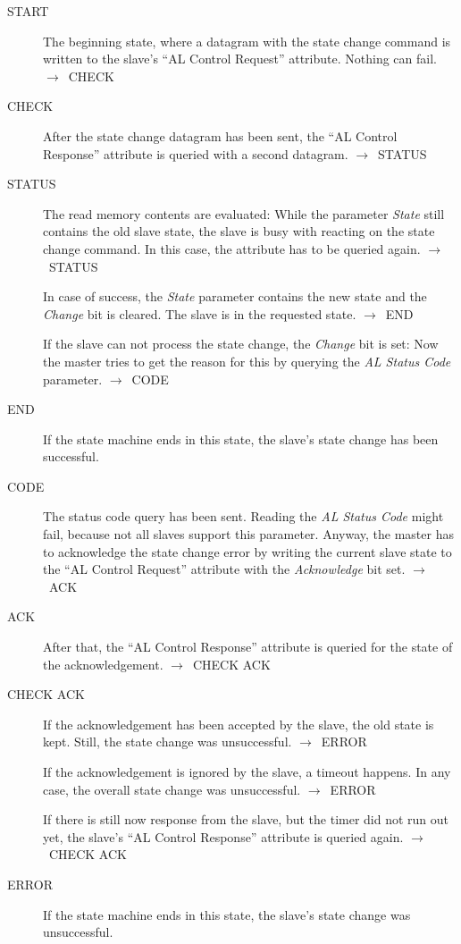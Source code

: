 \documentclass[a4paper,12pt,BCOR6mm,bibtotoc,idxtotoc]{scrbook}
\begin{document}
\begin{description}
\item[START] The beginning state, where a datagram with the state
  change command is written to the slave's ``AL Control Request''
  attribute. Nothing can fail. $\rightarrow$~CHECK

\item[CHECK] After the state change datagram has been sent, the ``AL
  Control Response'' attribute is queried with a second datagram.
  $\rightarrow$~STATUS

\item[STATUS] The read memory contents are evaluated: While the
  parameter \textit{State} still contains the old slave state, the
  slave is busy with reacting on the state change command. In this
  case, the attribute has to be queried again.
  $\rightarrow$~STATUS

  In case of success, the \textit{State} parameter contains the new
  state and the \textit{Change} bit is cleared. The slave is in the
  requested state.  $\rightarrow$~END

  If the slave can not process the state change, the \textit{Change}
  bit is set: Now the master tries to get the reason for this by
  querying the \textit{AL Status Code} parameter.
  $\rightarrow$~CODE

\item[END] If the state machine ends in this state, the slave's state
  change has been successful.

\item[CODE] The status code query has been sent. Reading the
  \textit{AL Status Code} might fail, because not all slaves support
  this parameter. Anyway, the master has to acknowledge the state
  change error by writing the current slave state to the ``AL Control
  Request'' attribute with the \textit{Acknowledge} bit set.
  $\rightarrow$~ACK

\item[ACK] After that, the ``AL Control Response'' attribute is
  queried for the state of the acknowledgement.
  $\rightarrow$~CHECK ACK

\item[CHECK ACK] If the acknowledgement has been accepted by the
  slave, the old state is kept. Still, the state change was
  unsuccessful. $\rightarrow$~ERROR

  If the acknowledgement is ignored by the slave, a timeout happens.
  In any case, the overall state change was unsuccessful.
  $\rightarrow$~ERROR

  If there is still now response from the slave, but the timer did not
  run out yet, the slave's ``AL Control Response'' attribute is
  queried again.  $\rightarrow$~CHECK ACK

\item[ERROR] If the state machine ends in this state, the slave's
  state change was unsuccessful.

\end{description}
\end{document}
